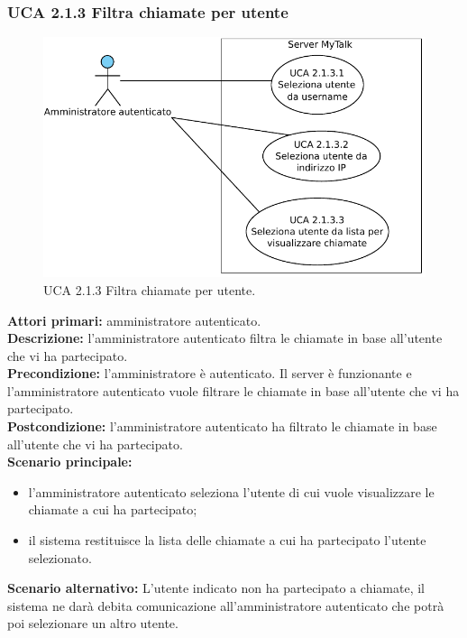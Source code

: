 \subsubsection{UCA 2.1.3 Filtra chiamate per utente}

\begin{figure}[htbp]
\centering
\includegraphics[scale=0.7]{./casi_uso/UCA2-1-3.pdf}
\caption{UCA 2.1.3 Filtra chiamate per utente.}
\end{figure}

\noindent
\textbf{Attori primari:} amministratore autenticato.\\
\textbf{Descrizione:} l'amministratore autenticato filtra le chiamate in base all'utente che vi ha partecipato.\\
\textbf{Precondizione:} l'amministratore è autenticato. Il server è funzionante e l'amministratore autenticato vuole filtrare le chiamate in base all'utente che vi ha partecipato.\\
\textbf{Postcondizione:} l'amministratore autenticato ha filtrato le chiamate in base all'utente che vi ha partecipato.\\
\textbf{Scenario principale:}
\begin{itemize}
\item l'amministratore autenticato seleziona l'utente di cui vuole visualizzare le chiamate a cui ha partecipato;
\item il sistema restituisce la lista delle chiamate a cui ha partecipato l'utente selezionato.
\end{itemize}
\textbf{Scenario alternativo:} L'utente indicato non ha partecipato a chiamate, il sistema ne darà debita comunicazione all'amministratore autenticato che potrà poi selezionare un altro utente.\\

